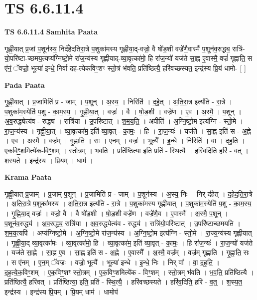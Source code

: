 \documentclass[17pt]{extarticle}
\begin{document}
\section{ TS 6.6.11.4 }

\textbf{TS 6.6.11.4 } \newline
\textbf{Samhita Paata} \newline

गृह्णी॒यात् प्र॒जां प॒शून॑स्य॒ निर्द॑हेदतिरा॒त्रे प॒शुका॑मस्य गृह्णीया॒द्-वज्रो॒ वै षो॑ड॒शी वज्रे॑णै॒वास्मै॑ प॒शून॑व॒रुद्ध्य॒ रात्रि॑-यो॒परि॑ष्टा-च्छमय॒त्यप्य॑ग्निष्टो॒मे रा॑ज॒न्य॑स्य गृह्णीयाद्-व्या॒वृत्का॑मो॒ हि रा॑ज॒न्यो॑ यज॑ते सा॒ह्न ए॒वास्मै॒ वज्रं॑ गृह्णाति॒ स ए॑नं॒ ॅवज्रो॒ भूत्या॑ इन्धे॒ निर्वा॑ दह-त्येकविꣳ॒॒शꣳ स्तो॒त्रं भ॑वति॒ प्रति॑ष्ठित्यै॒ हरि॑वच्छस्यत॒ इन्द्र॑स्य प्रि॒यं धामो- [  ] \newline

\textbf{Pada Paata} \newline

गृ॒ह्णी॒यात् । प्र॒जामिति॑ प्र - जाम् । प॒शून् । अ॒स्य॒ । निरिति॑ । द॒हे॒त् । अ॒ति॒रा॒त्र इत्य॑ति - रा॒त्रे । प॒शुका॑म॒स्येति॑ प॒शु - का॒म॒स्य॒ । गृ॒ह्णी॒या॒त् । वज्रः॑ । वै । षो॒ड॒शी । वज्रे॑ण । ए॒व । अ॒स्मै॒ । प॒शून् । अ॒व॒रुद्ध्येत्य॑व - रुद्ध्य॑ । रात्रि॑या । उ॒परि॑ष्टात् । श॒म॒य॒ति॒ । अपीति॑ । अ॒ग्नि॒ष्टो॒म इत्य॑ग्नि - स्तो॒मे । रा॒ज॒न्य॑स्य । गृ॒ह्णी॒या॒त् । व्या॒वृत्का॑म॒ इति॑ व्या॒वृत् - का॒मः॒ । हि । रा॒ज॒न्यः॑ । यज॑ते । सा॒ह्न इति॑ स - अ॒ह्ने । ए॒व । अ॒स्मै॒ । वज्र᳚म् । गृ॒ह्णा॒ति॒ । सः । ए॒न॒म् । वज्रः॑ । भूत्यै᳚ । इ॒न्धे॒ । निरिति॑ । वा॒ । द॒ह॒ति॒ । ए॒क॒विꣳ॒॒शमित्ये॑क-विꣳ॒॒शम् । स्तो॒त्रम् । भ॒व॒ति॒ । प्रति॑ष्ठित्या॒ इति॒ प्रति॑ - स्थि॒त्यै॒ । हरि॑व॒दिति॒ हरि॑ - व॒त् । श॒स्य॒ते॒ । इन्द्र॑स्य । प्रि॒यम् । धाम॑ ।  \newline


\textbf{Krama Paata} \newline

गृ॒ह्णी॒यात् प्र॒जाम् । प्र॒जाम् प॒शून् । प्र॒जामिति॑ प्र - जाम् । प॒शून॑स्य । अ॒स्य॒ निः । निर् द॑हेत् । द॒हे॒द॒ति॒रा॒त्रे । अ॒ति॒रा॒त्रे प॒शुका॑मस्य । अ॒ति॒रा॒त्र इत्य॑ति - रा॒त्रे । प॒शुका॑मस्य गृह्णीयात् । प॒शुका॑म॒स्येति॑ प॒शु - का॒म॒स्य॒ । गृ॒ह्णि॒या॒द् वज्रः॑ । वज्रो॒ वै । वै षो॑ड॒शी । षो॒ड॒शी वज्रे॑ण । वज्रे॑णै॒व । ए॒वास्मै᳚ । अ॒स्मै॒ प॒शून् । प॒शून॑व॒रुद्ध्य॑ । अ॒व॒रुद्ध्य॒ रात्रि॑या । अ॒व॒रुद्ध्येत्य॑व - रुद्ध्य॑ । रात्रि॑यो॒परि॑ष्टात् । उ॒परि॑ष्टाच्छमयति । श॒म॒य॒त्यपि॑ । अप्य॑ग्निष्टो॒मे । अ॒ग्नि॒ष्टो॒मे रा॑ज॒न्य॑स्य । अ॒ग्नि॒ष्टो॒म इत्य॑ग्नि - स्तो॒मे । रा॒ज्य॒न्य॑स्य गृह्णीयात् । गृ॒ह्णी॒या॒द् व्या॒वृत्का॑मः । व्या॒वृत्का॑मो॒ हि । व्या॒वृत्का॑म॒ इति॑ व्या॒वृत् - का॒मः॒ । हि रा॑ज॒न्यः॑ । रा॒ज॒न्यो॑ यज॑ते । यज॑ते सा॒ह्ने । सा॒ह्न ए॒व । सा॒ह्न इति॑ स - अ॒ह्ने । ए॒वास्मै᳚ । अ॒स्मै॒ वज्र᳚म् । वज्र॑म् गृह्णाति । गृ॒ह्णा॒ति॒ सः । स ए॑नम् । ए॒न॒म् ॅवज्रः॑ । वज्रो॒ भूत्यै᳚ । भूत्या॑ इन्धे । इ॒न्धे॒ निः । निर् वा᳚ । वा॒ द॒ह॒ति॒ । द॒ह॒त्ये॒क॒विꣳ॒॒शम् । ए॒क॒विꣳ॒॒शꣳ स्तो॒त्रम् । ए॒क॒विꣳ॒॒शमित्ये॑क - विꣳ॒॒शम् । स्तो॒त्रम् भ॑वति । भ॒व॒ति॒ प्रति॑ष्ठित्यै । प्रति॑ष्ठित्यै॒ हरि॑वत् । प्रति॑ष्ठित्या॒ इति॒ प्रति॑ - स्थि॒त्यै॒ । हरि॑वच्छस्यते । हरि॑व॒दिति॒ हरि॑ - व॒त्॒ । श॒स्य॒त॒ इन्द्र॑स्य । इन्द्र॑स्य प्रि॒यम् । प्रि॒यम् धाम॑ । धामोप॑ \newline
\end{document}
